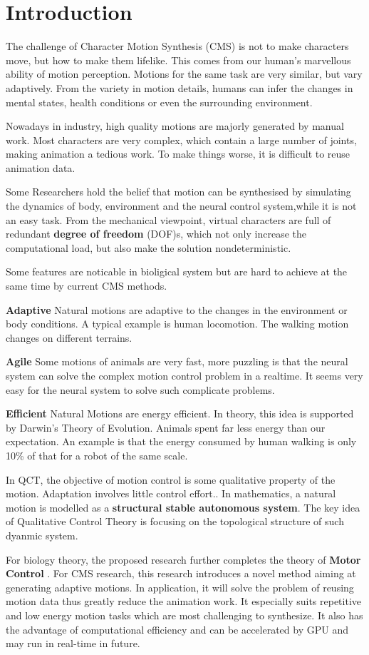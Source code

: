 \section{Introduction}

The challenge of Character Motion Synthesis (CMS) is not to make characters move, but how to make them lifelike. 
This comes from our human's marvellous ability of motion perception. 
Motions for the same task are very similar, but vary adaptively.
From the variety in motion details, humans can infer the changes in mental states, health conditions or even the surrounding environment. 

Nowadays in industry, high quality motions are majorly generated by manual work. 
Most characters are very complex, which contain a large number of joints, making animation a tedious work.
To make things worse, it is difficult to reuse animation data. 

Some Researchers hold the belief that motion can be synthesised by simulating the dynamics of body, environment and the neural control system,while it is not an easy task.
From the mechanical viewpoint,  
virtual characters are full of redundant \textbf{degree of freedom} (DOF)s,  which not only increase the computational load, but also make the solution nondeterministic. 



Some features are noticable in bioligical system but are hard to achieve at the same time by current CMS methods. 

\textbf{Adaptive} 
Natural motions are adaptive to the changes in the environment or body conditions. 
A typical example is human locomotion. 
The walking motion changes on different terrains. 

\textbf{Agile}
Some motions of animals are very fast, 
more puzzling is that the neural system can solve the complex motion control problem in a realtime. 
It seems very easy for the neural system to solve such complicate problems.

\textbf{Efficient}
Natural Motions are energy efficient.
In theory, this idea is supported by Darwin's Theory of Evolution.
Animals spent far less energy than our expectation.
An example is that the energy consumed by human walking is only 10\% of that for a robot of the same scale.




In QCT, the objective of motion control is some qualitative property of the motion.
Adaptation involves little  control effort..
In mathematics, a natural motion is modelled as a \textbf{structural stable autonomous system}.
The key idea of Qualitative Control Theory is focusing on the topological structure of such dyanmic system.

For biology theory, the proposed research further completes the theory of \textbf{Motor Control} . 
For CMS research, this research introduces a novel method aiming at generating adaptive motions. 
In application, it will solve the problem of reusing motion data thus greatly reduce the animation work.
It especially suits repetitive and low energy motion tasks which are most challenging to synthesize.
It also has the advantage of computational efficiency and can be accelerated by GPU and may run in real-time in future.


